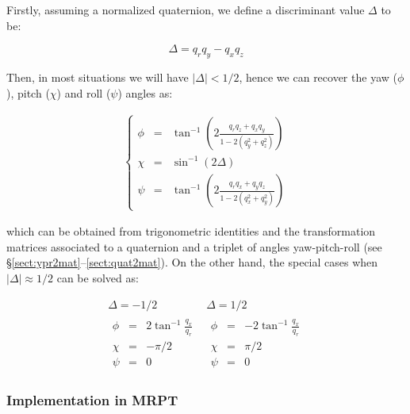 \documentclass[a4paper,10pt]{report}
\begin{document}
Firstly, assuming a normalized quaternion, we define a discriminant value $\Delta$ to be:

\begin{equation}
 \Delta = q_r q_y - q_x q_z
\end{equation}

Then, in most situations we will have $|\Delta|<1/2$, hence we can recover the
yaw ($\phi$),
pitch ($\chi$) and roll ($\psi$) angles as:

\begin{eqnarray}
\left\{
\begin{array}{rcl}
 \phi &=& \tan^{-1} \left( 2 \frac{q_r q_z + q_x q_y}{1-2(q_y^2+q_z^2)}  \right) \nonumber \\
 \chi &=& \sin^{-1} \left( 2 \Delta \right) \label{eq:quat2ypr_1} \\
 \psi &=& \tan^{-1} \left( 2 \frac{q_r q_x + q_y q_z}{1-2(q_x^2+q_y^2)}  \right) \nonumber
\end{array}
\right.
\end{eqnarray}

\noindent which can be obtained from trigonometric identities and 
the transformation matrices associated to a quaternion and a triplet of angles yaw-pitch-roll 
(see \S \ref{sect:ypr2mat}--\ref{sect:quat2mat}).
On the other hand, the special cases when $|\Delta| \approx 1/2$ can be solved as:

\begin{equation}
\begin{array}{c|c}
  \Delta = -1/2 & \Delta = 1/2 \\ \hline
  \begin{array}{rcl}
    \phi &=& 2 \tan^{-1} \frac{q_x}{q_r} \\
    \chi &=& -\pi /2 \\
    \psi &=& 0
  \end{array} 
&
  \begin{array}{rcl}
    \phi &=& -2 \tan^{-1} \frac{q_x}{q_r} \\
    \chi &=& \pi /2 \\
    \psi &=& 0
  \end{array} 
\end{array}
\label{eq:quat2ypr_2}
\end{equation}


\subsubsection{Implementation in MRPT}
\end{document}
